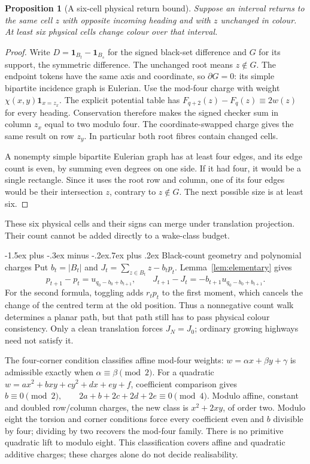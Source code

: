 \documentclass[11pt,letterpaper]{article}
\makeatletter
\renewcommand\subsection{\@startsection{subsection}{2}{\z@}%
  {-1.5ex plus -.3ex minus -.2ex}{.7ex plus .2ex}%
  {\normalfont\large\bfseries}}
\newtheorem{proposition}[theorem]{Proposition}
\newcommand{\che}{\chi}
\makeatother
\begin{document}
\begin{proposition}[A six-cell physical return bound]
Suppose an interval returns to the same cell $z$ with opposite incoming
heading and with $z$ unchanged in colour. At least six physical cells
change colour over that interval.
\end{proposition}
\begin{proof}
Write $D=\mathbf1_{B_t}-\mathbf1_{B_s}$ for the signed black-set difference and $G$ for its support,
the symmetric difference. The unchanged root means $z\notin G$.
The endpoint tokens have the same axis and coordinate, so
$\partial G=0$: its simple bipartite incidence graph is Eulerian.
Use the mod-four charge with weight $\che(x,y)\mathbf1_{x=z_x}$.
The explicit potential table has
$F_{q+2}(z)-F_q(z)\equiv2w(z)$ for every heading. Conservation
therefore makes the signed checker sum in column $z_x$ equal to
two modulo four. The coordinate-swapped charge gives the same result
on row $z_y$. In particular both root fibres contain changed cells.

A nonempty simple bipartite Eulerian graph has at least four edges,
and its edge count is even, by summing even degrees on one side.
If it had four, it would be a single rectangle. Since it uses the
root row and column, one of its four edges would be their intersection
$z$, contrary to $z\notin G$. The next possible size is at least six.
\end{proof}
These six physical cells and their signs can merge under translation
projection. Their count cannot be added directly to a wake-class budget.

\subsection{Black-count geometry and polynomial charges}
Put $b_t=|B_t|$ and $J_t=\sum_{z\in B_t}z-b_tp_t$.
Lemma~\ref{lem:elementary} gives
\[
p_{t+1}-p_t=u_{q_0-b_0+b_{t+1}},\qquad
J_{t+1}-J_t=-b_{t+1}u_{q_0-b_0+b_{t+1}}.
\]
For the second formula, toggling adds $r_tp_t$ to the first moment,
which cancels the change of the centred term at the old position.
Thus a nonnegative count walk determines a planar path, but that path
still has to pass physical colour consistency. Only a clean translation
forces $J_N=J_0$; ordinary growing highways need not satisfy it.

The four-corner condition classifies affine mod-four weights:
$w=\alpha x+\beta y+\gamma$ is admissible exactly when
$\alpha\equiv\beta\pmod2$. For a quadratic
$w=ax^2+bxy+cy^2+dx+ey+f$, coefficient comparison gives
$b\equiv0\pmod2,\qquad 2a+b+2c+2d+2e\equiv0\pmod4$.
Modulo affine, constant and doubled row/column charges, the new class is
$x^2+2xy$, of order two. Modulo eight the torsion and corner conditions
force every coefficient even and $b$ divisible by four; dividing by two
recovers the mod-four family. There is no primitive quadratic lift to
modulo eight. This classification covers affine and quadratic additive charges;
these charges alone do not decide realisability.
\end{document}
